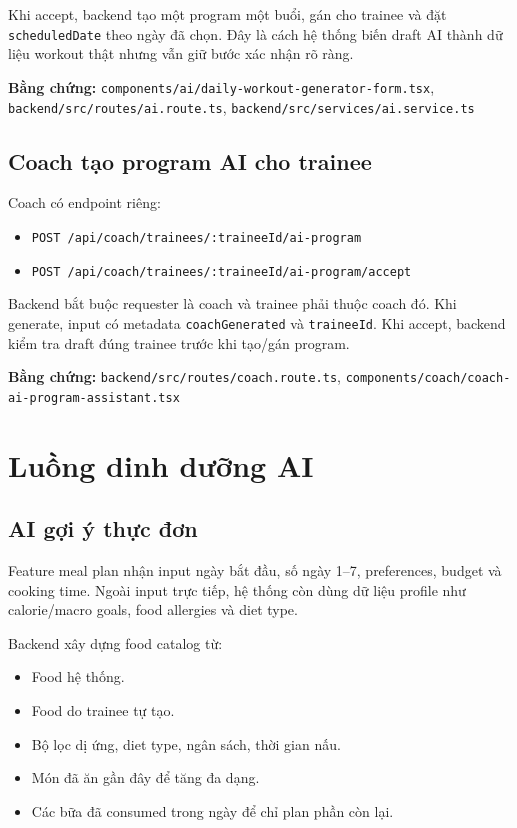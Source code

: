 \documentclass[12pt,a4paper]{article}
\newcommand{\code}[1]{\texttt{#1}}
\newcommand{\evidence}[1]{{\small\nolinkurl{#1}}}
\begin{document}
Khi accept, backend tạo một program một buổi, gán cho trainee và đặt \code{scheduledDate} theo ngày đã chọn. Đây là cách hệ thống biến draft AI thành dữ liệu workout thật nhưng vẫn giữ bước xác nhận rõ ràng.

\textbf{Bằng chứng:} \evidence{components/ai/daily-workout-generator-form.tsx}, \evidence{backend/src/routes/ai.route.ts}, \evidence{backend/src/services/ai.service.ts}

\subsection{Coach tạo program AI cho trainee}

Coach có endpoint riêng:

\begin{itemize}
  \item \code{POST /api/coach/trainees/:traineeId/ai-program}
  \item \code{POST /api/coach/trainees/:traineeId/ai-program/accept}
\end{itemize}

Backend bắt buộc requester là coach và trainee phải thuộc coach đó. Khi generate, input có metadata \code{coachGenerated} và \code{traineeId}. Khi accept, backend kiểm tra draft đúng trainee trước khi tạo/gán program.

\textbf{Bằng chứng:} \evidence{backend/src/routes/coach.route.ts}, \evidence{components/coach/coach-ai-program-assistant.tsx}

\section{Luồng dinh dưỡng AI}

\subsection{AI gợi ý thực đơn}

Feature meal plan nhận input ngày bắt đầu, số ngày 1--7, preferences, budget và cooking time. Ngoài input trực tiếp, hệ thống còn dùng dữ liệu profile như calorie/macro goals, food allergies và diet type.

Backend xây dựng food catalog từ:

\begin{itemize}
  \item Food hệ thống.
  \item Food do trainee tự tạo.
  \item Bộ lọc dị ứng, diet type, ngân sách, thời gian nấu.
  \item Món đã ăn gần đây để tăng đa dạng.
  \item Các bữa đã consumed trong ngày để chỉ plan phần còn lại.
\end{itemize}
\end{document}
